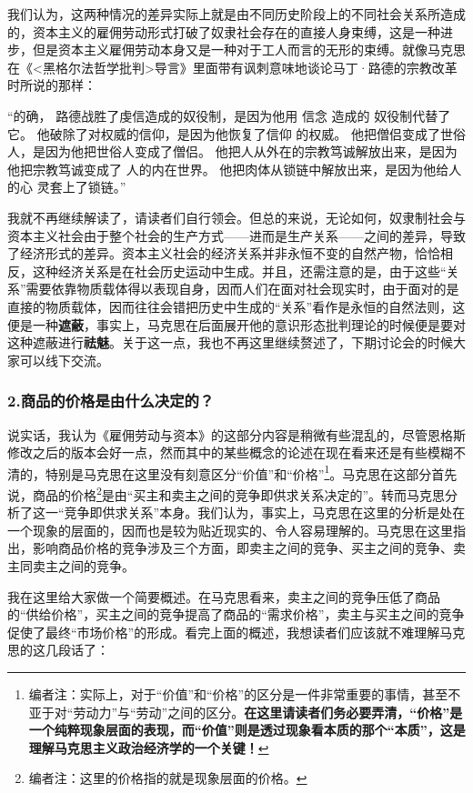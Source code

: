 \documentclass[a4paper,twoside,12pt,AutoFakeBold]{ctexart}
\begin{document}
我们认为，这两种情况的差异实际上就是由不同历史阶段上的不同社会关系所造成的，资本主义的雇佣劳动形式打破了奴隶社会存在的直接人身束缚，这是一种进步，但是资本主义雇佣劳动本身又是一种对于工人而言的无形的束缚。就像马克思在《<黑格尔法哲学批判>导言》里面带有讽刺意味地谈论马丁·路德的宗教改革时所说的那样：
\begin{adjustwidth}{2em}{2em}
   \qquad\fangsong
   “的确， 路德战胜了虔信造成的奴役制，是因为他用 信念 造成的
奴役制代替了它。 他破除了对权威的信仰，是因为他恢复了信仰
的权威。 他把僧侣变成了世俗人，是因为他把世俗人变成了僧侣。
他把人从外在的宗教笃诚解放出来，是因为他把宗教笃诚变成了
人的内在世界。 他把肉体从锁链中解放出来，是因为他给人的心
灵套上了锁链。”
\end{adjustwidth}

我就不再继续解读了，请读者们自行领会。但总的来说，无论如何，奴隶制社会与资本主义社会由于整个社会的生产方式——进而是生产关系——之间的差异，导致了经济形式的差异。资本主义社会的经济关系并非永恒不变的自然产物，恰恰相反，这种经济关系是在社会历史运动中生成。并且，还需注意的是，由于这些“关系”需要依靠物质载体得以表现自身，因而人们在面对社会现实时，由于面对的是直接的物质载体，因而往往会错把历史中生成的“关系”看作是永恒的自然法则，这便是一种\textbf{遮蔽}，事实上，马克思在后面展开他的意识形态批判理论的时候便是要对这种遮蔽进行\textbf{祛魅}。关于这一点，我也不再这里继续赘述了，下期讨论会的时候大家可以线下交流。

\subsubsection{2.商品的价格是由什么决定的？}
说实话，我认为《雇佣劳动与资本》的这部分内容是稍微有些混乱的，尽管恩格斯修改之后的版本会好一点，然而其中的某些概念的论述在现在看来还是有些模糊不清的，特别是马克思在这里没有刻意区分“价值”和“价格”\footnote{编者注：实际上，对于“价值”和“价格”的区分是一件非常重要的事情，甚至不亚于对“劳动力”与“劳动”之间的区分。\textbf{在这里请读者们务必要弄清，“价格”是一个纯粹现象层面的表现，而“价值”则是透过现象看本质的那个“本质”，这是理解马克思主义政治经济学的一个关键！}}。马克思在这部分首先说，商品的价格\footnote{编者注：这里的价格指的就是现象层面的价格。}是由“买主和卖主之间的竞争即供求关系决定的”。转而马克思分析了这一“竞争即供求关系”本身。我们认为，事实上，马克思在这里的分析是处在一个现象的层面的，因而也是较为贴近现实的、令人容易理解的。马克思在这里指出，影响商品价格的竞争涉及三个方面，即卖主之间的竞争、买主之间的竞争、卖主同卖主之间的竞争。

我在这里给大家做一个简要概述。在马克思看来，卖主之间的竞争压低了商品的“供给价格”，买主之间的竞争提高了商品的“需求价格”，卖主与买主之间的竞争促使了最终“市场价格”的形成。看完上面的概述，我想读者们应该就不难理解马克思的这几段话了：
\end{document}

